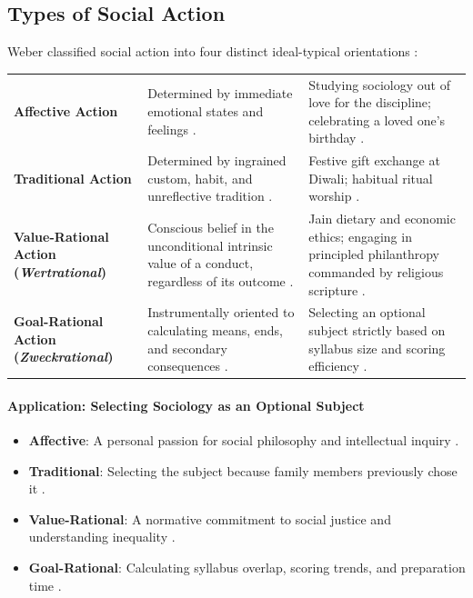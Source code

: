 \subsection{Types of Social Action}

Weber classified social action into four distinct ideal-typical orientations :

\begin{table}[htbp]
\centering
\begin{tabularx}{\textwidth}{p{3.8cm} Y Y}
\hline
{}
 &  &  \\
\hline
\textbf{Affective Action} & Determined by immediate emotional states and feelings . & Studying sociology out of love for the discipline; celebrating a loved one's birthday . \\
\textbf{Traditional Action} & Determined by ingrained custom, habit, and unreflective tradition . & Festive gift exchange at Diwali; habitual ritual worship . \\
\textbf{Value-Rational Action (\textit{Wertrational})} & Conscious belief in the unconditional intrinsic value of a conduct, regardless of its outcome . & Jain dietary and economic ethics; engaging in principled philanthropy commanded by religious scripture . \\
\textbf{Goal-Rational Action (\textit{Zweckrational})} & Instrumentally oriented to calculating means, ends, and secondary consequences . & Selecting an optional subject strictly based on syllabus size and scoring efficiency . \\
\hline
\end{tabularx}
\end{table}

\paragraph{Application: Selecting Sociology as an Optional Subject}
\begin{itemize}
    \item \textbf{Affective}: A personal passion for social philosophy and intellectual inquiry .
    \item \textbf{Traditional}: Selecting the subject because family members previously chose it .
    \item \textbf{Value-Rational}: A normative commitment to social justice and understanding inequality .
    \item \textbf{Goal-Rational}: Calculating syllabus overlap, scoring trends, and preparation time .
\end{itemize}

